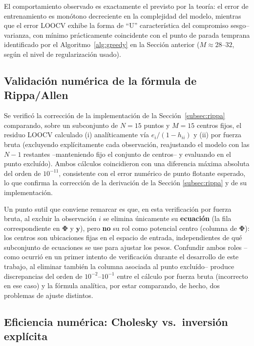 \documentclass[11pt,a4paper]{article}
\newcommand{\Phimat}{\boldsymbol{\Phi}}
\newcommand{\yvec}{\mathbf{y}}
\begin{document}
El comportamiento observado es exactamente el previsto por la teor\'ia: el
error de entrenamiento es mon\'otono decreciente en la complejidad del modelo,
mientras que el error LOOCV exhibe la forma de ``U'' caracter\'istica del
compromiso sesgo--varianza, con m\'inimo pr\'acticamente coincidente con el
punto de parada temprana identificado por el Algoritmo~\ref{alg:greedy} en
la Secci\'on anterior ($M\approx 28$--$32$, seg\'un el nivel de regularizaci\'on
usado).

\subsection{Validaci\'on num\'erica de la f\'ormula de Rippa/Allen}
\label{subsec:validacion_numerica}

Se verific\'o la correcci\'on de la implementaci\'on de la
Secci\'on~\ref{subsec:rippa} comparando, sobre un subconjunto de $N=15$ puntos
y $M=15$ centros fijos, el residuo LOOCV calculado (i) anal\'iticamente v\'ia
$e_i/(1-h_{ii})$ y (ii) por fuerza bruta (excluyendo expl\'icitamente cada
observaci\'on, reajustando el modelo con las $N-1$ restantes --manteniendo
fijo el conjunto de centros-- y evaluando en el punto exclu\'ido). Ambos
c\'alculos coincidieron con una diferencia m\'axima absoluta del orden de
$10^{-11}$, consistente con el error num\'erico de punto flotante esperado, lo
que confirma la correcci\'on de la derivaci\'on de la Secci\'on
\ref{subsec:rippa} y de su implementaci\'on.

Un punto sutil que conviene remarcar es que, en esta verificaci\'on por fuerza
bruta, al excluir la observaci\'on $i$ se elimina \'unicamente su
\textbf{ecuaci\'on} (la fila correspondiente en $\Phimat$ y $\yvec$), pero
\textbf{no} su rol como potencial centro (columna de $\Phimat$): los centros
son ubicaciones fijas en el espacio de entrada, independientes de qu\'e
subconjunto de ecuaciones se use para ajustar los pesos. Confundir ambos roles
--como ocurri\'o en un primer intento de verificaci\'on durante el desarrollo
de este trabajo, al eliminar tambi\'en la columna asociada al punto
exclu\'ido-- produce discrepancias del orden de $10^{-2}$--$10^{-1}$ entre el
c\'alculo por fuerza bruta (incorrecto en ese caso) y la f\'ormula anal\'itica,
por estar comparando, de hecho, dos problemas de ajuste distintos.

\subsection{Eficiencia num\'erica: Cholesky vs.\ inversi\'on expl\'icita}
\end{document}
